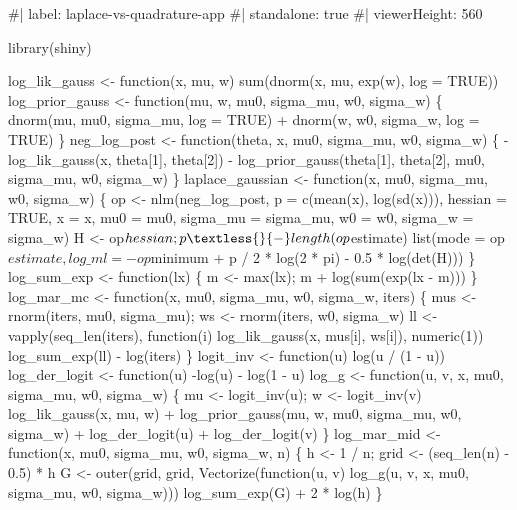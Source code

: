 \documentclass[
  letterpaper,
  DIV=11,
  numbers=noendperiod]{scrreprt}
\newenvironment{Shaded}{\begin{snugshade}}{\end{snugshade}}
\newcommand{\NormalTok}[1]{\textcolor[rgb]{0.00,0.23,0.31}{#1}}
\begin{document}
\begin{Shaded}
\begin{Highlighting}[]
\NormalTok{\#| label: laplace{-}vs{-}quadrature{-}app}
\NormalTok{\#| standalone: true}
\NormalTok{\#| viewerHeight: 560}

\NormalTok{library(shiny)}

\NormalTok{log\_lik\_gauss  \textless{}{-} function(x, mu, w) sum(dnorm(x, mu, exp(w), log = TRUE))}
\NormalTok{log\_prior\_gauss \textless{}{-} function(mu, w, mu0, sigma\_mu, w0, sigma\_w) \{}
\NormalTok{  dnorm(mu, mu0, sigma\_mu, log = TRUE) + dnorm(w, w0, sigma\_w, log = TRUE)}
\NormalTok{\}}
\NormalTok{neg\_log\_post \textless{}{-} function(theta, x, mu0, sigma\_mu, w0, sigma\_w) \{}
\NormalTok{  {-}log\_lik\_gauss(x, theta[1], theta[2]) {-} log\_prior\_gauss(theta[1], theta[2], mu0, sigma\_mu, w0, sigma\_w)}
\NormalTok{\}}
\NormalTok{laplace\_gaussian \textless{}{-} function(x, mu0, sigma\_mu, w0, sigma\_w) \{}
\NormalTok{  op \textless{}{-} nlm(neg\_log\_post, p = c(mean(x), log(sd(x))), hessian = TRUE,}
\NormalTok{            x = x, mu0 = mu0, sigma\_mu = sigma\_mu, w0 = w0, sigma\_w = sigma\_w)}
\NormalTok{  H \textless{}{-} op$hessian; p \textless{}{-} length(op$estimate)}
\NormalTok{  list(mode = op$estimate, log\_ml = {-}op$minimum + p / 2 * log(2 * pi) {-} 0.5 * log(det(H)))}
\NormalTok{\}}
\NormalTok{log\_sum\_exp \textless{}{-} function(lx) \{ m \textless{}{-} max(lx); m + log(sum(exp(lx {-} m))) \}}
\NormalTok{log\_mar\_mc \textless{}{-} function(x, mu0, sigma\_mu, w0, sigma\_w, iters) \{}
\NormalTok{  mus \textless{}{-} rnorm(iters, mu0, sigma\_mu); ws \textless{}{-} rnorm(iters, w0, sigma\_w)}
\NormalTok{  ll \textless{}{-} vapply(seq\_len(iters), function(i) log\_lik\_gauss(x, mus[i], ws[i]), numeric(1))}
\NormalTok{  log\_sum\_exp(ll) {-} log(iters)}
\NormalTok{\}}
\NormalTok{logit\_inv     \textless{}{-} function(u) log(u / (1 {-} u))}
\NormalTok{log\_der\_logit \textless{}{-} function(u) {-}log(u) {-} log(1 {-} u)}
\NormalTok{log\_g \textless{}{-} function(u, v, x, mu0, sigma\_mu, w0, sigma\_w) \{}
\NormalTok{  mu \textless{}{-} logit\_inv(u); w \textless{}{-} logit\_inv(v)}
\NormalTok{  log\_lik\_gauss(x, mu, w) + log\_prior\_gauss(mu, w, mu0, sigma\_mu, w0, sigma\_w) +}
\NormalTok{    log\_der\_logit(u) + log\_der\_logit(v)}
\NormalTok{\}}
\NormalTok{log\_mar\_mid \textless{}{-} function(x, mu0, sigma\_mu, w0, sigma\_w, n) \{}
\NormalTok{  h \textless{}{-} 1 / n; grid \textless{}{-} (seq\_len(n) {-} 0.5) * h}
\NormalTok{  G \textless{}{-} outer(grid, grid, Vectorize(function(u, v) log\_g(u, v, x, mu0, sigma\_mu, w0, sigma\_w)))}
\NormalTok{  log\_sum\_exp(G) + 2 * log(h)}
\NormalTok{\}}


\end{Highlighting}
\end{Shaded}
\end{document}
